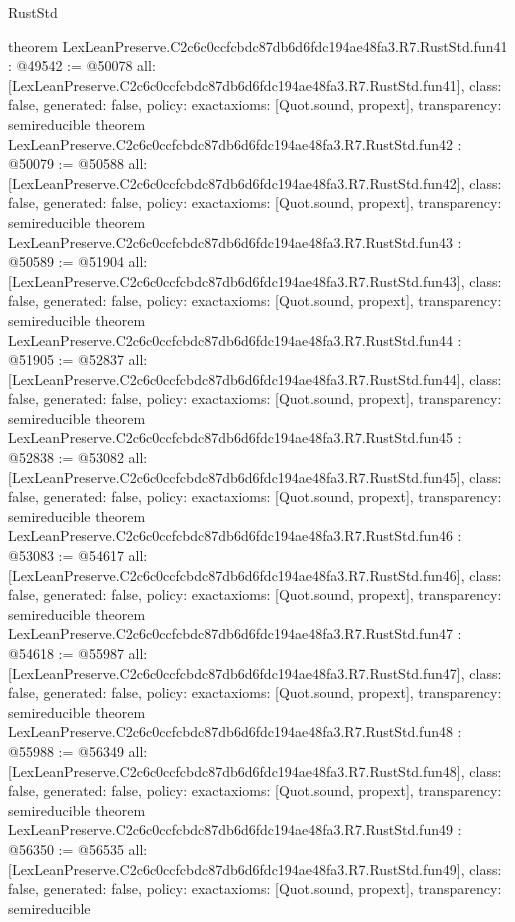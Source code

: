\begin{lexlean}{RustStd}
\begin{coremodule}
{}
theorem LexLeanPreserve.C2c6c0ccfcbdc87db6d6fdc194ae48fa3.R7.RustStd.fun41 : @49542 := @50078 {
  all: [LexLeanPreserve.C2c6c0ccfcbdc87db6d6fdc194ae48fa3.R7.RustStd.fun41],
  class: false,
  generated: false,
  policy: exact{axioms: [Quot.sound, propext]},
  transparency: semireducible
}
theorem LexLeanPreserve.C2c6c0ccfcbdc87db6d6fdc194ae48fa3.R7.RustStd.fun42 : @50079 := @50588 {
  all: [LexLeanPreserve.C2c6c0ccfcbdc87db6d6fdc194ae48fa3.R7.RustStd.fun42],
  class: false,
  generated: false,
  policy: exact{axioms: [Quot.sound, propext]},
  transparency: semireducible
}
theorem LexLeanPreserve.C2c6c0ccfcbdc87db6d6fdc194ae48fa3.R7.RustStd.fun43 : @50589 := @51904 {
  all: [LexLeanPreserve.C2c6c0ccfcbdc87db6d6fdc194ae48fa3.R7.RustStd.fun43],
  class: false,
  generated: false,
  policy: exact{axioms: [Quot.sound, propext]},
  transparency: semireducible
}
theorem LexLeanPreserve.C2c6c0ccfcbdc87db6d6fdc194ae48fa3.R7.RustStd.fun44 : @51905 := @52837 {
  all: [LexLeanPreserve.C2c6c0ccfcbdc87db6d6fdc194ae48fa3.R7.RustStd.fun44],
  class: false,
  generated: false,
  policy: exact{axioms: [Quot.sound, propext]},
  transparency: semireducible
}
theorem LexLeanPreserve.C2c6c0ccfcbdc87db6d6fdc194ae48fa3.R7.RustStd.fun45 : @52838 := @53082 {
  all: [LexLeanPreserve.C2c6c0ccfcbdc87db6d6fdc194ae48fa3.R7.RustStd.fun45],
  class: false,
  generated: false,
  policy: exact{axioms: [Quot.sound, propext]},
  transparency: semireducible
}
theorem LexLeanPreserve.C2c6c0ccfcbdc87db6d6fdc194ae48fa3.R7.RustStd.fun46 : @53083 := @54617 {
  all: [LexLeanPreserve.C2c6c0ccfcbdc87db6d6fdc194ae48fa3.R7.RustStd.fun46],
  class: false,
  generated: false,
  policy: exact{axioms: [Quot.sound, propext]},
  transparency: semireducible
}
theorem LexLeanPreserve.C2c6c0ccfcbdc87db6d6fdc194ae48fa3.R7.RustStd.fun47 : @54618 := @55987 {
  all: [LexLeanPreserve.C2c6c0ccfcbdc87db6d6fdc194ae48fa3.R7.RustStd.fun47],
  class: false,
  generated: false,
  policy: exact{axioms: [Quot.sound, propext]},
  transparency: semireducible
}
theorem LexLeanPreserve.C2c6c0ccfcbdc87db6d6fdc194ae48fa3.R7.RustStd.fun48 : @55988 := @56349 {
  all: [LexLeanPreserve.C2c6c0ccfcbdc87db6d6fdc194ae48fa3.R7.RustStd.fun48],
  class: false,
  generated: false,
  policy: exact{axioms: [Quot.sound, propext]},
  transparency: semireducible
}
theorem LexLeanPreserve.C2c6c0ccfcbdc87db6d6fdc194ae48fa3.R7.RustStd.fun49 : @56350 := @56535 {
  all: [LexLeanPreserve.C2c6c0ccfcbdc87db6d6fdc194ae48fa3.R7.RustStd.fun49],
  class: false,
  generated: false,
  policy: exact{axioms: [Quot.sound, propext]},
  transparency: semireducible
}
\end{coremodule}
\end{lexlean}
